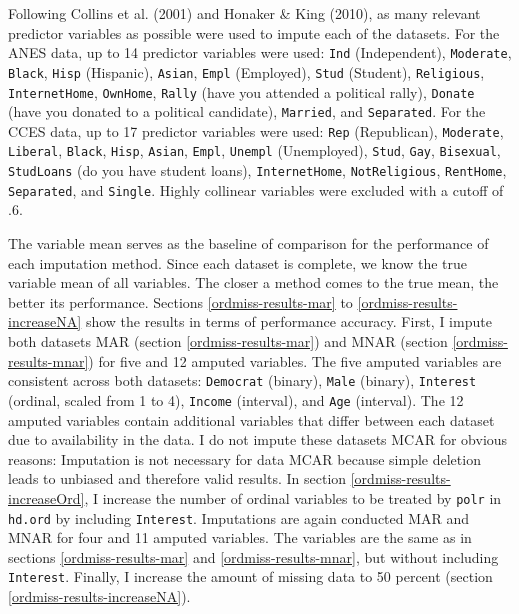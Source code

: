 \documentclass[12pt,econ]{sources/authesis}
\begin{document}
Following Collins et al. (2001) and Honaker \& King (2010), as many relevant predictor variables as possible were used to impute each of the datasets. For the ANES data, up to 14 predictor variables were used: \texttt{Ind} (Independent), \texttt{Moderate}, \texttt{Black}, \texttt{Hisp} (Hispanic), \texttt{Asian}, \texttt{Empl} (Employed), \texttt{Stud} (Student), \texttt{Religious}, \texttt{InternetHome}, \texttt{OwnHome}, \texttt{Rally} (have you attended a political rally), \texttt{Donate} (have you donated to a political candidate), \texttt{Married}, and \texttt{Separated}. For the CCES data, up to 17 predictor variables were used: \texttt{Rep} (Republican), \texttt{Moderate}, \texttt{Liberal}, \texttt{Black}, \texttt{Hisp}, \texttt{Asian}, \texttt{Empl}, \texttt{Unempl} (Unemployed), \texttt{Stud}, \texttt{Gay}, \texttt{Bisexual}, \texttt{StudLoans} (do you have student loans), \texttt{InternetHome}, \texttt{NotReligious}, \texttt{RentHome}, \texttt{Separated}, and \texttt{Single}. Highly collinear variables were excluded with a cutoff of .6.

The variable mean serves as the baseline of comparison for the performance of each imputation method. Since each dataset is complete, we know the true variable mean of all variables. The closer a method comes to the true mean, the better its performance. Sections \ref{ordmiss-results-mar} to \ref{ordmiss-results-increaseNA} show the results in terms of performance accuracy. First, I impute both datasets MAR (section \ref{ordmiss-results-mar}) and MNAR (section \ref{ordmiss-results-mnar}) for five and 12 amputed variables. The five amputed variables are consistent across both datasets: \texttt{Democrat} (binary), \texttt{Male} (binary), \texttt{Interest} (ordinal, scaled from 1 to 4), \texttt{Income} (interval), and \texttt{Age} (interval). The 12 amputed variables contain additional variables that differ between each dataset due to availability in the data. I do not impute these datasets MCAR for obvious reasons: Imputation is not necessary for data MCAR because simple deletion leads to unbiased and therefore valid results. In section \ref{ordmiss-results-increaseOrd}, I increase the number of ordinal variables to be treated by \texttt{polr} in \texttt{hd.ord} by including \texttt{Interest}. Imputations are again conducted MAR and MNAR for four and 11 amputed variables. The variables are the same as in sections \ref{ordmiss-results-mar} and \ref{ordmiss-results-mnar}, but without including \texttt{Interest}. Finally, I increase the amount of missing data to 50 percent (section \ref{ordmiss-results-increaseNA}).
\end{document}
